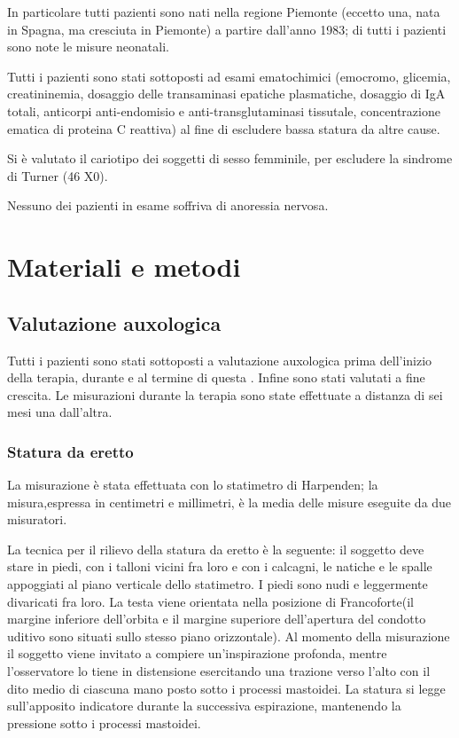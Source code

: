 In particolare tutti pazienti sono nati nella regione Piemonte (eccetto una, nata in Spagna, ma cresciuta in Piemonte) a partire dall'anno 1983; di tutti i pazienti sono note le misure neonatali.

Tutti i pazienti sono stati sottoposti ad esami ematochimici (emocromo, glicemia, creatininemia, dosaggio delle transaminasi epatiche plasmatiche, dosaggio di IgA totali, anticorpi anti-endomisio e anti-transglutaminasi tissutale, concentrazione ematica di proteina C reattiva) al fine di escludere bassa statura da altre cause. 

Si è valutato il cariotipo dei soggetti di sesso femminile, per escludere la sindrome di Turner (46 X0). 

Nessuno dei pazienti in esame soffriva di anoressia nervosa.


\section{Materiali e metodi}

\subsection{Valutazione auxologica}
Tutti i pazienti sono stati sottoposti a valutazione auxologica prima dell'inizio della terapia, durante e al termine di questa . Infine sono stati valutati a fine crescita. Le misurazioni durante la terapia sono state effettuate a distanza di sei mesi una dall'altra.

\subsubsection*{Statura da eretto}
 La misurazione è stata effettuata con lo statimetro di Harpenden; la misura,espressa in centimetri e millimetri, è la media delle misure eseguite da due misuratori.

 La tecnica per il rilievo della statura da eretto è la seguente: il soggetto deve stare in piedi, con i talloni vicini fra loro e con i calcagni, le natiche e le spalle appoggiati al piano verticale dello statimetro. I piedi sono nudi e leggermente divaricati fra loro. La testa viene orientata nella posizione di Francoforte(il margine inferiore dell'orbita e il margine superiore dell'apertura del condotto uditivo sono situati sullo stesso piano orizzontale). Al momento della misurazione il soggetto viene invitato a compiere un'inspirazione profonda, mentre l'osservatore lo tiene in distensione esercitando una trazione verso l'alto con il dito medio di ciascuna mano posto sotto i processi mastoidei. La statura si legge sull'apposito indicatore durante la successiva espirazione, mantenendo la pressione sotto i processi mastoidei.%

